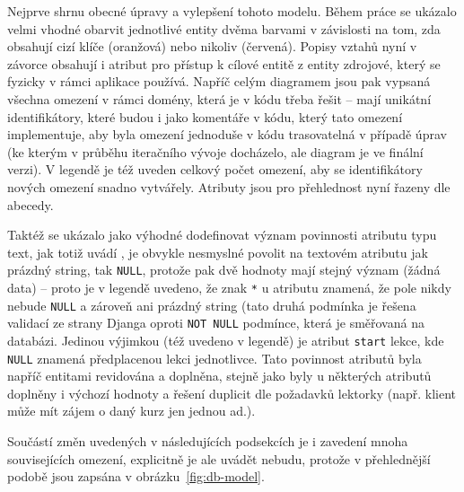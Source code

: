 Nejprve shrnu obecné úpravy a vylepšení tohoto modelu. Během práce se ukázalo velmi vhodné obarvit jednotlivé entity dvěma barvami v závislosti na tom, zda obsahují cizí klíče (oranžová) nebo nikoliv (červená). Popisy vztahů nyní v závorce obsahují i atribut pro přístup k cílové entitě z entity zdrojové, který se fyzicky v rámci aplikace používá. Napříč celým diagramem jsou pak vypsaná všechna omezení v rámci domény, která je v kódu třeba řešit -- mají unikátní identifikátory, které budou i jako komentáře v kódu, který tato omezení implementuje, aby byla omezení jednoduše v kódu trasovatelná v případě úprav (ke kterým v průběhu iteračního vývoje docházelo, ale diagram je ve finální verzi). V legendě je též uveden celkový počet omezení, aby se identifikátory nových omezení snadno vytvářely. Atributy jsou pro přehlednost nyní řazeny dle abecedy.

Taktéž se ukázalo jako výhodné dodefinovat význam povinnosti atributu typu text, jak totiž uvádí \cite{django-docs-model}, je obvykle nesmyslné povolit na textovém atributu jak prázdný string, tak \verb|NULL|, protože pak dvě hodnoty mají stejný význam (žádná data) -- proto je v legendě uvedeno, že znak \verb|*| u atributu znamená, že pole nikdy nebude \verb|NULL| a zároveň ani prázdný string (tato druhá podmínka je řešena validací ze strany Djanga oproti \verb|NOT NULL| podmínce, která je směřovaná na databázi. Jedinou výjimkou (též uvedeno v legendě) je atribut \verb|start| lekce, kde \verb|NULL| znamená předplacenou lekci jednotlivce. Tato povinnost atributů byla napříč entitami revidována a doplněna, stejně jako byly u některých atributů doplněny i výchozí hodnoty a řešení duplicit dle požadavků lektorky (např. klient může mít zájem o daný kurz jen jednou ad.).

Součástí změn uvedených v následujících podsekcích je i zavedení mnoha souvisejících omezení, explicitně je ale uvádět nebudu, protože v přehlednější podobě jsou zapsána v obrázku~\ref{fig:db-model}.

